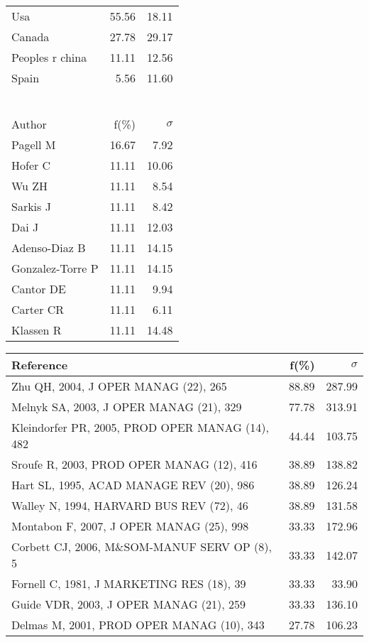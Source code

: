 \documentclass[a4paper,11pt]{report}
\begin{document}
\begin{landscape}
\begin{table}[!ht]
{\begin{tabular}{|l r r|}
\hline
Usa & 55.56 & 18.11\\
Canada & 27.78 & 29.17\\
Peoples r china & 11.11 & 12.56\\
Spain & 5.56 & 11.60\\
 &  & \\
 &  & \\
 &  & \\
 &  & \\
 &  & \\
 &  & \\
\hline
\hline
Author & f(\%) & $\sigma$\\
\hline
Pagell M & 16.67 & 7.92\\
Hofer C & 11.11 & 10.06\\
Wu ZH & 11.11 & 8.54\\
Sarkis J & 11.11 & 8.42\\
Dai J & 11.11 & 12.03\\
Adenso-Diaz B & 11.11 & 14.15\\
Gonzalez-Torre P & 11.11 & 14.15\\
Cantor DE & 11.11 & 9.94\\
Carter CR & 11.11 & 6.11\\
Klassen R & 11.11 & 14.48\\
\hline
\end{tabular}
}
{\scriptsize\begin{tabular}{|l r r|}
\hline
Reference & f(\%) & $\sigma$\\
\hline
Zhu QH, 2004, J OPER MANAG (22), 265 & 88.89 & 287.99\\
Melnyk SA, 2003, J OPER MANAG (21), 329 & 77.78 & 313.91\\
Kleindorfer PR, 2005, PROD OPER MANAG (14), 482 & 44.44 & 103.75\\
Sroufe R, 2003, PROD OPER MANAG (12), 416 & 38.89 & 138.82\\
Hart SL, 1995, ACAD MANAGE REV (20), 986 & 38.89 & 126.24\\
Walley N, 1994, HARVARD BUS REV (72), 46 & 38.89 & 131.58\\
Montabon F, 2007, J OPER MANAG (25), 998 & 33.33 & 172.96\\
Corbett CJ, 2006, M\&SOM-MANUF SERV OP (8), 5 & 33.33 & 142.07\\
Fornell C, 1981, J MARKETING RES (18), 39 & 33.33 & 33.90\\
Guide VDR, 2003, J OPER MANAG (21), 259 & 33.33 & 136.10\\
Delmas M, 2001, PROD OPER MANAG (10), 343 & 27.78 & 106.23\\

\end{tabular}}
\end{table}
\end{landscape}
\end{document}
